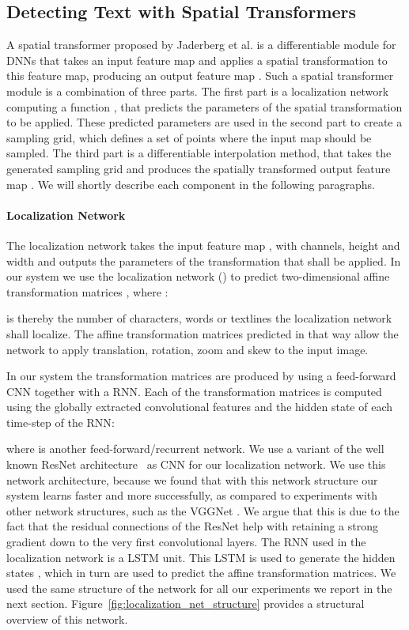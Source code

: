 \documentclass[letterpaper]{article}
\begin{document}
	\subsection{Detecting Text with Spatial Transformers}
	\label{subsec:ps_spatial_transformer_networks}

	A spatial transformer proposed by Jaderberg et al. \cite{Jaderberg2015Spatial} is a differentiable module for \acp{DNN} that takes an input feature map  and applies a spatial transformation to this feature map, producing an output feature map .
	Such a spatial transformer module is a combination of three parts.
	The first part is a localization network computing a function , that predicts the parameters  of the spatial transformation to be applied.
	These predicted parameters are used in the second part to create a sampling grid, which defines a set of points where the input map should be sampled.
	The third part is a differentiable interpolation method, that takes the generated sampling grid and produces the spatially transformed output feature map .
	We will shortly describe each component in the following paragraphs.

	\paragraph{Localization Network}
		The localization network takes the input feature map , with  channels, height  and width  and outputs the parameters  of the transformation that shall be applied.
		In our system we use the localization network () to predict  two-dimensional affine transformation matrices , where :
		

		 is thereby the number of characters, words or textlines the localization network shall localize.
		The affine transformation matrices predicted in that way allow the network to apply translation, rotation, zoom and skew to the input image.

		In our system the  transformation matrices  are produced by using a feed-forward \ac{CNN} together with a \ac{RNN}. Each of the  transformation matrices is computed using the globally extracted convolutional features  and the hidden state  of each time-step of the \ac{RNN}:
		
		where  is another feed-forward/recurrent network.
		We use a variant of the well known ResNet architecture~\cite{He2016Deep} as \ac{CNN} for our localization network.
		We use this network architecture, because we found that with this network structure our system learns faster and more successfully, as compared to experiments with other network structures, such as the VGGNet \cite{Simonyan2015Very}.
		We argue that this is due to the fact that the residual connections of the ResNet help with retaining a strong gradient down to the very first convolutional layers.
		The \ac{RNN} used in the localization network is a \ac{LSTM} \cite{Hochreiter1997Long} unit.
		This \ac{LSTM} is used to generate the hidden states , which in turn are used to predict the affine transformation matrices.
		We used the same structure of the network for all our experiments we report in the next section.
		Figure~\ref{fig:localization_net_structure} provides a structural overview of this network.
\end{document}
